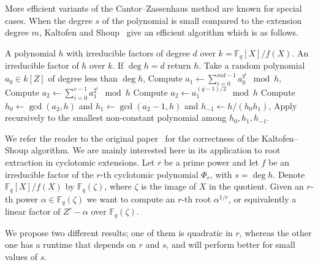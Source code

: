 \documentclass[12pt]{article}
\theoremstyle{plain}
\theoremstyle{definition}
\def\F{\ensuremath{\mathbb{F}}}
\newcounter{algorithm}
\begin{document}
More efficient variants of the Cantor--Zassenhaus method are known for
special cases. When the degree $s$ of the polynomial is small compared
to the extension degree $m$, Kaltofen and Shoup~\cite{kaltofen+shoup97} 
give an efficient algorithm which is as follows.

\begin{algorithm}
	\label{alg:ks}
	\begin{algorithmic}[1]
		\REQUIRE A polynomial $h$  with irreducible factors of degree $d$ over $k=\F_q[X]/f(X)$.
		\ENSURE An irreducible factor of $h$ over $k$.
		\STATE If $\deg h = d$ return $h$.
		\STATE Take a random polynomial $a_0\in k[Z]$ of degree less than $\deg h$,
		\STATE\label{alg:ks-pseudotrace} Compute $\displaystyle a_1 
		\leftarrow \sum_{i=0}^{md-1} a_0^{q^i} \mod h$,
		\STATE\label{alg:ks:even} Compute $\displaystyle a_2 \leftarrow 
		\sum_{i=0}^{e-1} a_1^{2^i}\mod h$
		\ELSE
		\STATE\label{alg:ks:odd} Compute $a_2 \leftarrow a_1^{(q-1)/2}\mod h$
		\ENDIF
		\STATE\label{alg:ks:gcd} Compute $h_0\leftarrow\gcd(a_2,h)$ and 
		$h_1\leftarrow\gcd(a_2-1,h)$ and $h_{-1}\leftarrow h/(h_0h_1)$,
		\STATE Apply recursively to the smallest non-constant polynomial among 
		$h_0,h_1,h_{-1}$.
	\end{algorithmic}
\end{algorithm}


We refer the reader to the original paper~\cite{kaltofen+shoup97} for
the correctness of the Kaltofen--Shoup algorithm. We are mainly
interested here in its application to root extraction in cyclotomic
extensions. Let $r$ be a prime power and let $f$ be an irreducible
factor of the $r$-th cyclotomic polynomial $\Phi_r$, with $s = \deg
h$. Denote $\F_q[X] / f(X)$ by $\F_q(\zeta)$, where $\zeta$ is the
image of $X$ in the quotient. Given an $r$-th power $\alpha \in
\F_q(\zeta)$ we want to compute an $r$-th root $\alpha^{1 / r}$, or
equivalently a linear factor of $Z^r - \alpha$ over $\F_q(\zeta)$.

We propose two different results; one of them is quadratic in $r$,
whereas the other one has a runtime that depends on $r$ and $s$,
and will perform better for small values of $s$.
\end{document}
